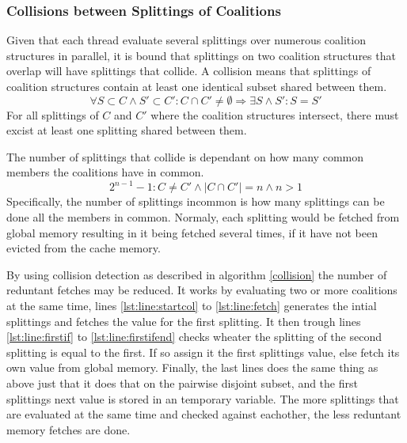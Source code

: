 \documentclass{llncs}
\begin{document}
\subsubsection{Collisions between Splittings of Coalitions} \label{sectionsplit}
Given that each thread evaluate several splittings over numerous coalition structures in parallel, 
it is bound that splittings on two coalition structures that overlap will have splittings that collide.
A collision means that splittings of coalition structures contain at least one identical subset shared between them.
\begin{displaymath}\forall S\subset C \wedge S' \subset C' : C \cap C' \neq \emptyset \Rightarrow \exists S \wedge S' : S = S'\end{displaymath}
For all splittings of $C$ and $C'$ where the coalition structures intersect, there must excist at least one splitting shared between them.

The number of splittings that collide is dependant on how many common members the coalitions have in common.
\begin{displaymath}2^{n-1}-1:C\neq C'\wedge |C \cap C'| = n \wedge n > 1 \end{displaymath}
Specifically, the number of splittings incommon is how many splittings
can be done all the members in common.
Normaly, each splitting would be fetched from global memory resulting in it being fetched several times, 
if it have not been evicted from the cache memory.

By using collision detection as described in algorithm \ref{collision} the number of reduntant fetches may be reduced.
It works by evaluating two or more coalitions at the same time, lines \ref{lst:line:startcol} to \ref{lst:line:fetch} generates
the intial splittings and fetches the value for the first splitting. It then trough lines \ref{lst:line:firstif} to \ref{lst:line:firstifend}
checks wheater the splitting of the second splitting is equal to the first. 
If so assign it the first splittings value, else fetch its own value from global memory. 
Finally, the last lines does the same thing as above just that it does that on the pairwise disjoint subset, 
and the first splittings next value is stored in an temporary variable. 
The more splittings that are evaluated at the same time and checked against eachother, the less reduntant memory fetches are done.
\end{document}
